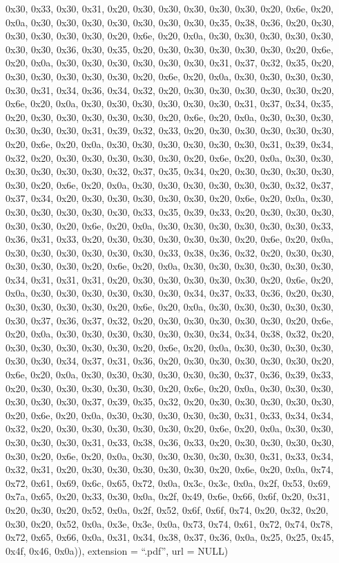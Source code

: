 \documentclass[
]{book}
\begin{document}
0x30, 0x33, 0x30, 0x31, 0x20, 0x30, 0x30, 0x30, 0x30, 0x30, 0x20, 0x6e, 0x20, 0x0a, 0x30, 0x30, 0x30, 0x30, 0x30, 0x30, 0x30, 0x35, 0x38, 0x36, 0x20, 0x30, 0x30, 0x30, 0x30, 0x30, 0x20, 0x6e, 0x20, 0x0a, 0x30, 0x30, 0x30, 0x30, 0x30, 0x30, 0x30, 0x36, 0x30, 0x35, 0x20, 0x30, 0x30, 0x30, 0x30, 0x30, 0x20, 0x6e, 0x20, 0x0a, 0x30, 0x30, 0x30, 0x30, 0x30, 0x30, 0x31, 0x37, 0x32, 0x35, 0x20, 0x30, 0x30, 0x30, 0x30, 0x30, 0x20, 0x6e, 0x20, 0x0a, 0x30, 0x30, 0x30, 0x30, 0x30, 0x31, 0x34, 0x36, 0x34, 0x32,
0x20, 0x30, 0x30, 0x30, 0x30, 0x30, 0x20, 0x6e, 0x20, 0x0a, 0x30, 0x30, 0x30, 0x30, 0x30, 0x30, 0x31, 0x37, 0x34, 0x35, 0x20, 0x30, 0x30, 0x30, 0x30, 0x30, 0x20, 0x6e, 0x20, 0x0a, 0x30, 0x30, 0x30, 0x30, 0x30, 0x30, 0x31, 0x39, 0x32, 0x33, 0x20, 0x30, 0x30, 0x30, 0x30, 0x30, 0x20, 0x6e, 0x20, 0x0a, 0x30, 0x30, 0x30, 0x30, 0x30, 0x30, 0x31, 0x39, 0x34, 0x32, 0x20, 0x30, 0x30, 0x30, 0x30, 0x30, 0x20, 0x6e, 0x20, 0x0a, 0x30, 0x30, 0x30, 0x30, 0x30, 0x30, 0x32, 0x37, 0x35, 0x34, 0x20, 0x30, 0x30, 0x30,
0x30, 0x30, 0x20, 0x6e, 0x20, 0x0a, 0x30, 0x30, 0x30, 0x30, 0x30, 0x30, 0x32, 0x37, 0x37, 0x34, 0x20, 0x30, 0x30, 0x30, 0x30, 0x30, 0x20, 0x6e, 0x20, 0x0a, 0x30, 0x30, 0x30, 0x30, 0x30, 0x30, 0x33, 0x35, 0x39, 0x33, 0x20, 0x30, 0x30, 0x30, 0x30, 0x30, 0x20, 0x6e, 0x20, 0x0a, 0x30, 0x30, 0x30, 0x30, 0x30, 0x30, 0x33, 0x36, 0x31, 0x33, 0x20, 0x30, 0x30, 0x30, 0x30, 0x30, 0x20, 0x6e, 0x20, 0x0a, 0x30, 0x30, 0x30, 0x30, 0x30, 0x30, 0x33, 0x38, 0x36, 0x32, 0x20, 0x30, 0x30, 0x30, 0x30, 0x30, 0x20, 0x6e,
0x20, 0x0a, 0x30, 0x30, 0x30, 0x30, 0x30, 0x30, 0x34, 0x31, 0x31, 0x31, 0x20, 0x30, 0x30, 0x30, 0x30, 0x30, 0x20, 0x6e, 0x20, 0x0a, 0x30, 0x30, 0x30, 0x30, 0x30, 0x30, 0x34, 0x37, 0x33, 0x36, 0x20, 0x30, 0x30, 0x30, 0x30, 0x30, 0x20, 0x6e, 0x20, 0x0a, 0x30, 0x30, 0x30, 0x30, 0x30, 0x30, 0x37, 0x36, 0x37, 0x32, 0x20, 0x30, 0x30, 0x30, 0x30, 0x30, 0x20, 0x6e, 0x20, 0x0a, 0x30, 0x30, 0x30, 0x30, 0x30, 0x30, 0x34, 0x34, 0x38, 0x32, 0x20, 0x30, 0x30, 0x30, 0x30, 0x30, 0x20, 0x6e, 0x20, 0x0a, 0x30, 0x30,
0x30, 0x30, 0x30, 0x30, 0x34, 0x37, 0x31, 0x36, 0x20, 0x30, 0x30, 0x30, 0x30, 0x30, 0x20, 0x6e, 0x20, 0x0a, 0x30, 0x30, 0x30, 0x30, 0x30, 0x30, 0x37, 0x36, 0x39, 0x33, 0x20, 0x30, 0x30, 0x30, 0x30, 0x30, 0x20, 0x6e, 0x20, 0x0a, 0x30, 0x30, 0x30, 0x30, 0x30, 0x30, 0x37, 0x39, 0x35, 0x32, 0x20, 0x30, 0x30, 0x30, 0x30, 0x30, 0x20, 0x6e, 0x20, 0x0a, 0x30, 0x30, 0x30, 0x30, 0x30, 0x31, 0x33, 0x34, 0x34, 0x32, 0x20, 0x30, 0x30, 0x30, 0x30, 0x30, 0x20, 0x6e, 0x20, 0x0a, 0x30, 0x30, 0x30, 0x30, 0x30, 0x31,
0x33, 0x38, 0x36, 0x33, 0x20, 0x30, 0x30, 0x30, 0x30, 0x30, 0x20, 0x6e, 0x20, 0x0a, 0x30, 0x30, 0x30, 0x30, 0x30, 0x31, 0x33, 0x34, 0x32, 0x31, 0x20, 0x30, 0x30, 0x30, 0x30, 0x30, 0x20, 0x6e, 0x20, 0x0a, 0x74, 0x72, 0x61, 0x69, 0x6c, 0x65, 0x72, 0x0a, 0x3c, 0x3c, 0x0a, 0x2f, 0x53, 0x69, 0x7a, 0x65, 0x20, 0x33, 0x30, 0x0a, 0x2f, 0x49, 0x6e, 0x66, 0x6f, 0x20, 0x31, 0x20, 0x30, 0x20, 0x52, 0x0a, 0x2f, 0x52, 0x6f, 0x6f, 0x74, 0x20, 0x32, 0x20, 0x30, 0x20, 0x52, 0x0a, 0x3e, 0x3e, 0x0a, 0x73, 0x74, 0x61,
0x72, 0x74, 0x78, 0x72, 0x65, 0x66, 0x0a, 0x31, 0x34, 0x38, 0x37, 0x36, 0x0a, 0x25, 0x25, 0x45, 0x4f, 0x46, 0x0a)), extension = ``.pdf'', url = NULL)
\end{document}
